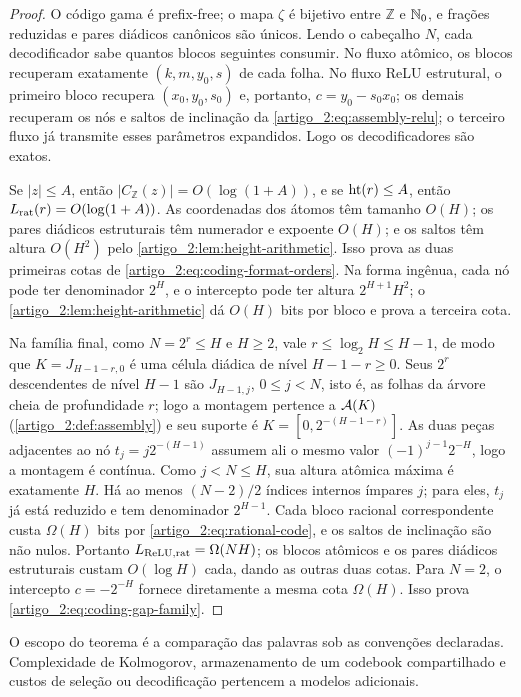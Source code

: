 \begin{proof}
O código gama é prefix-free; o mapa $\zeta$ é bijetivo entre $\mathbb Z$ e
$\mathbb{N}_0$, e frações reduzidas e pares diádicos canônicos são únicos. Lendo o
cabeçalho $N$, cada decodificador sabe quantos blocos seguintes consumir. No
fluxo atômico, os blocos recuperam exatamente $(k,m,y_0,s)$ de cada folha. No
fluxo ReLU estrutural, o primeiro bloco recupera $(x_0,y_0,s_0)$ e, portanto,
$c=y_0-s_0x_0$; os demais recuperam os nós e saltos de inclinação da
\cref{artigo_2:eq:assembly-relu}; o terceiro fluxo já transmite esses parâmetros
expandidos. Logo os decodificadores são exatos.

Se $|z|\le A$, então $|C_{\mathbb Z}(z)|=O(\log(1+A))$, e se
$\operatorname{ht}(r)\le A$, então $L_{\rm rat}(r)=O(\log(1+A))$. As coordenadas dos
átomos têm tamanho $O(H)$; os pares diádicos estruturais têm numerador e
expoente $O(H)$; e os saltos têm altura $O(H^2)$ pelo
\cref{artigo_2:lem:height-arithmetic}. Isso prova as duas primeiras cotas de
\eqref{artigo_2:eq:coding-format-orders}. Na forma ingênua, cada nó pode ter
denominador $2^H$, e o intercepto pode ter altura $2^{H+1}H^2$; o
\cref{artigo_2:lem:height-arithmetic} dá $O(H)$ bits por bloco e prova a terceira cota.

Na família final, como $N=2^r\le H$ e $H\ge2$, vale $r\le\log_2H\le H-1$, de
modo que $K=J_{H-1-r,0}$ é uma célula diádica de nível $H-1-r\ge0$. Seus
$2^r$ descendentes de nível $H-1$ são $J_{H-1,j}$, $0\le j<N$, isto é, as
folhas da árvore cheia de profundidade $r$; logo a montagem pertence a
$\mathcal{A}(K)$ (\cref{artigo_2:def:assembly}) e seu suporte é $K=[0,2^{-(H-1-r)}]$.
As duas peças adjacentes ao nó
$t_j=j2^{-(H-1)}$ assumem ali o mesmo valor
$(-1)^{j-1}2^{-H}$, logo a montagem é contínua. Como $j<N\le H$, sua altura
atômica máxima é exatamente $H$. Há ao menos $(N-2)/2$ índices internos
ímpares $j$; para eles, $t_j$ já está reduzido e tem denominador
$2^{H-1}$. Cada bloco racional correspondente custa $\Omega(H)$ bits por
\eqref{artigo_2:eq:rational-code}, e os saltos de inclinação são não nulos. Portanto
$L_{\rm ReLU,rat}=\Omega(NH)$; os blocos atômicos e os pares diádicos
estruturais custam $O(\log H)$ cada, dando as outras duas cotas. Para $N=2$,
o intercepto $c=-2^{-H}$ fornece diretamente a mesma cota $\Omega(H)$.
Isso prova \eqref{artigo_2:eq:coding-gap-family}.
\end{proof}

O escopo do teorema é a comparação das palavras sob as convenções declaradas.
Complexidade de Kolmogorov, armazenamento de um codebook compartilhado e
custos de seleção ou decodificação pertencem a modelos adicionais.

